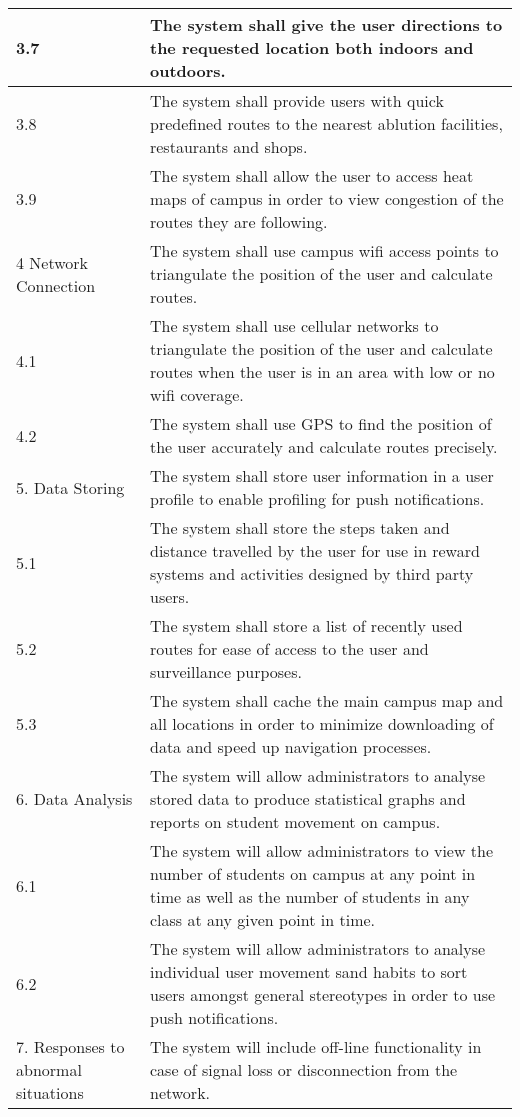 \documentclass[12pt,a4paper]{report}
\begin{document}
\begin{longtable}{| p{} | p{} |}
\hline
3.7 & The system shall give the user directions to the requested location both indoors and outdoors.\\
\hline
3.8& The system shall provide users with quick predefined routes to the nearest ablution facilities, restaurants and shops.\\
\hline
3.9& The system shall allow the user to access heat maps of campus in order to view congestion of the routes they are following.\\
\hline
4 Network Connection & The system shall use campus wifi access points to triangulate the position of the user and calculate routes.  \\
\hline
4.1 & The system shall use cellular networks to triangulate the position of the user and calculate routes when the user is in an area with low or no wifi coverage.\\
\hline
4.2 & The system shall use GPS to find the position of the user accurately and calculate routes precisely.\\
\hline
5. Data Storing & The system shall store user information in a user profile to enable profiling for push notifications.\\
\hline
5.1 & The system shall store the steps taken and distance travelled by the user for use in reward systems and activities designed by third party users.\\
\hline
5.2 & The system shall store a list of recently used routes for ease of access to the user and surveillance purposes.\\
\hline
5.3 & The system shall cache the main campus map and all locations in order to minimize downloading of data and speed up navigation processes.\\
\hline
6. Data Analysis & The system will allow administrators to analyse stored data to produce statistical graphs and reports on student movement on campus.\\
\hline
6.1 & The system will allow administrators to view the number of students on campus at any point in time as well as the number of students in any class at any given point in time.\\
\hline
6.2 & The system will allow administrators to analyse individual user movement sand habits to sort users amongst general stereotypes in order to use push notifications.\\
\hline
7. Responses to abnormal situations & The system will include off-line functionality in case of signal loss or disconnection from the network.\\

\end{longtable}
\end{document}
